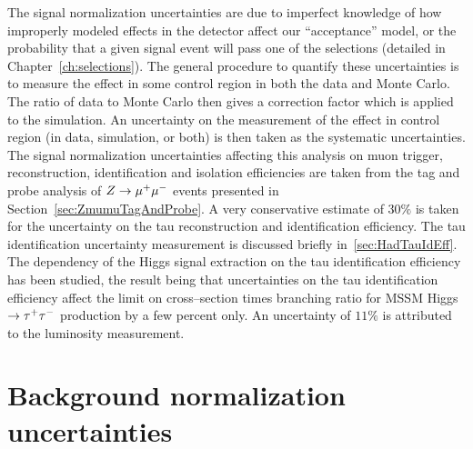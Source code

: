 The signal normalization uncertainties are due to imperfect knowledge of how
improperly modeled effects in the detector affect our ``acceptance'' model, or
the probability that a given signal event will pass one of the selections
(detailed in Chapter~\ref{ch:selections}).  The general procedure to quantify
these uncertainties is to measure the effect in some control region in both the
data and Monte Carlo.  The ratio of data to Monte Carlo then gives a correction
factor which is applied to the simulation.  An uncertainty on the measurement of
the effect in control region (in data, simulation, or both) is then taken as the
systematic uncertainties.  The signal normalization uncertainties affecting this
analysis on muon trigger, reconstruction, identification and isolation
efficiencies are taken from the tag and probe analysis of $Z \to \mu^+\mu^-$ events
presented in Section~\ref{sec:ZmumuTagAndProbe}.  A very conservative estimate
of $30\%$ is taken for the uncertainty on the tau
reconstruction and identification efficiency.  The tau
identification uncertainty measurement is discussed briefly
in~\ref{sec:HadTauIdEff}.  The dependency of the Higgs signal extraction on the
tau identification efficiency has been studied, the result being that
uncertainties on the tau identification efficiency affect the limit on
cross--section times branching ratio for MSSM Higgs $\to \tau^+\tau^-$ production by a
few percent only.  An uncertainty of $11\%$ is attributed to the luminosity
measurement.

\section{Background normalization uncertainties}

